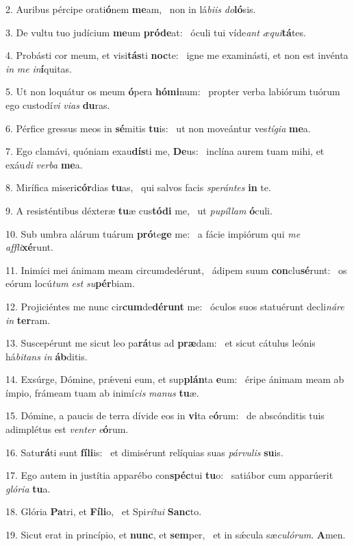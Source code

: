 2. Auribus pércipe orati\textbf{ó}nem \textbf{me}am, \ast\  non in lá\textit{bi}\textit{is} \textit{do}\textbf{ló}sis.\

3. De vultu tuo judícium \textbf{me}um \textbf{pród}\textbf{e}at: \ast\  óculi tui víde\textit{ant} \textit{æ}\textit{qui}\textbf{tá}tes.\

4. Probásti cor meum, et visi\textbf{tás}ti \textbf{noc}te: \ast\  igne me examinásti, et non est invénta \textit{in} \textit{me} \textit{in}\textbf{í}quitas.\

5. Ut non loquátur os meum \textbf{ó}pera \textbf{hó}\textbf{mi}num: \ast\  propter verba labiórum tuórum ego custodí\textit{vi} \textit{vi}\textit{as} \textbf{du}ras.\

6. Pérfice gressus meos in \textbf{sé}mitis \textbf{tu}is: \ast\  ut non moveántur ves\textit{tí}\textit{gi}\textit{a} \textbf{me}a.\

7. Ego clamávi, quóniam exau\textbf{dís}ti me, \textbf{De}us: \ast\  inclína aurem tuam mihi, et exáu\textit{di} \textit{ver}\textit{ba} \textbf{me}a.\

8. Mirífica miseri\textbf{cór}dias \textbf{tu}as, \ast\  qui salvos facis \textit{spe}\textit{rán}\textit{tes} \textbf{in} te.\

9. A resisténtibus déxteræ \textbf{tu}æ cus\textbf{tó}\textbf{di} me, \ast\  ut \textit{pu}\textit{píl}\textit{lam} \textbf{ó}culi.\

10. Sub umbra alárum tuárum \textbf{pró}te\textbf{ge} me: \ast\  a fácie impiórum qui \textit{me} \textit{af}\textit{fli}\textbf{xé}runt.\

11. Inimíci mei ánimam meam circumdedérunt, \dag\  ádipem suum \textbf{con}clu\textbf{sé}runt: \ast\  os eórum locú\textit{tum} \textit{est} \textit{su}\textbf{pér}biam.\

12. Projiciéntes me nunc cir\textbf{cum}de\textbf{dé}\textbf{runt} me: \ast\  óculos suos statuérunt decli\textit{ná}\textit{re} \textit{in} \textbf{ter}ram.\

13. Suscepérunt me sicut leo pa\textbf{rá}tus ad \textbf{præ}dam: \ast\  et sicut cátulus leónis há\textit{bi}\textit{tans} \textit{in} \textbf{áb}ditis.\

14. Exsúrge, Dómine, prǽveni eum, et sup\textbf{plán}ta \textbf{e}um: \ast\  éripe ánimam meam ab ímpio, frámeam tuam ab inimí\textit{cis} \textit{ma}\textit{nus} \textbf{tu}æ.\

15. Dómine, a paucis de terra dívide eos in \textbf{vi}ta e\textbf{ó}rum: \ast\  de abscónditis tuis adimplétus est \textit{ven}\textit{ter} \textit{e}\textbf{ó}rum.\

16. Satu\textbf{rá}ti sunt \textbf{fí}\textbf{li}is: \ast\  et dimisérunt relíquias suas \textit{pár}\textit{vu}\textit{lis} \textbf{su}is.\

17. Ego autem in justítia apparébo con\textbf{spéc}tui \textbf{tu}o: \ast\  satiábor cum apparúerit \textit{gló}\textit{ri}\textit{a} \textbf{tu}a.\

18. Glória \textbf{Pa}tri, et \textbf{Fí}\textbf{li}o, \ast\  et Spi\textit{rí}\textit{tu}\textit{i} \textbf{Sanc}to.\

19. Sicut erat in princípio, et \textbf{nunc}, et \textbf{sem}per, \ast\  et in sǽcula sæ\textit{cu}\textit{ló}\textit{rum}. \textbf{A}men.\

